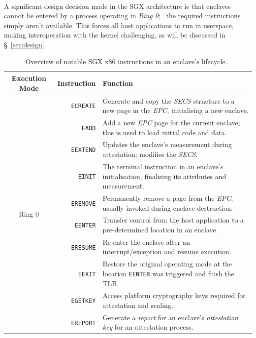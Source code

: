 \paragraph{} \label{sec:sgx-no-kernel-mode} A significant design decision made in the SGX architecture is that enclaves cannot be entered by a process operating in \textit{Ring 0};~\cite{sgx-prog-reference} the required instructions simply aren't available. This forces all host applications to run in userspace, making interoperation with the kernel challenging, as will be discussed in §~\ref{sec:design}.

\begin{table}
    \centering
    \newcommand\tableTop{\rule{0pt}{3ex}}
    \newcommand\tableMid{\rule{0pt}{3ex}}
    \newcommand\tableBottom{\rule[-2ex]{0pt}{0pt}}
    \begin{tabular}{|c|r|p{8.5cm}|} 
        \hline
        Execution Mode & Instruction & Function \\ [0.1ex] 
        \hline\hline
        \multirow{11}{*}{Ring 0} 
            & \tableTop{\texttt{ECREATE}} & \tableTop{Generate and copy the \textit{SECS} structure to a new page in the \textit{EPC}, initialising a new enclave.} \\ 
            & \texttt{EADD} & \tableMid{Add a new \textit{EPC} page for the current enclave; this is used to load initial code and data.} \\ 
            & \texttt{EEXTEND} & \tableMid{Updates the enclave's measurement during attestation; modifies the \textit{SECS}.} \\ 
            & \texttt{EINIT} & \tableMid{The terminal instruction in an enclave's initialisation, finalising its attributes and measurement.} \\ 
            & \texttt{EREMOVE} & \tableMid{Permanently remove a page from the \textit{EPC}; usually invoked during enclave destruction.} \tableBottom \\ 
        \hline\hline
        \multirow{11}{*}{Ring 3} 
        & \tableTop{\texttt{EENTER}} & \tableTop{Transfer control from the host application to a pre-determined location in an enclave.} \\ 
        & \texttt{ERESUME} & \tableMid{Re-enter the enclave after an interrupt/exception and resume execution.} \\ 
        & \texttt{EEXIT} & \tableMid{Restore the original operating mode at the location \texttt{EENTER} was triggered and flush the TLB.} \\ 
        & \texttt{EGETKEY} & \tableMid{Access platform cryptography keys required for attestation and sealing.} \\ 
        & \texttt{EREPORT} & \tableMid{Generate a \textit{report} for an enclave's \textit{attestation key} for an attestation process.} \tableBottom \\ 
        \hline
    \end{tabular}
    \vspace{5mm}
    \caption{Overview of notable SGX x86 instructions in an enclave's lifecycle.~\cite{sgx-prog-reference}}
    \label{table:sgx-instructions}
\end{table}


